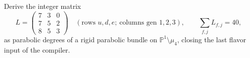 \begin{goal}
Derive the integer matrix
\[
  L=\begin{pmatrix}7&3&0\\7&5&2\\8&5&3\end{pmatrix}
  \quad(\text{rows }u,d,e;\ \text{columns gen }1,2,3),\qquad \sum_{f,j}L_{f,j}=40 ,
\]
as parabolic degrees of a rigid parabolic bundle on $\mathbb P^1\setminus\mu_4$, closing the last
flavor input of the compiler.
\end{goal}

